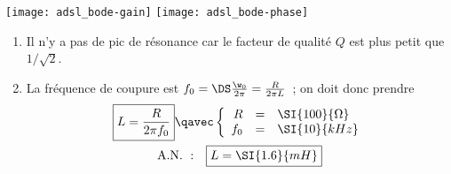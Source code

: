 \documentclass[a4paper, 12pt, final, garamond]{book}
\begin{document}
\begin{center}
    \texttt{[image: adsl\_bode-gain]}
    \texttt{[image: adsl\_bode-phase]}
\end{center}
\begin{enumerate}[resume]
    \item{} Il n'y a pas de pic de résonance car le facteur de qualité $Q$ est
        plus petit que $1/\sqrt{2}$.
    \item La fréquence de coupure est $f_0 = \DS \frac{\w_0}{2\pi} =
        \frac{R}{2\pi L}$~; on doit donc prendre
        \begin{gather*}
            \boxed{L = \frac{R}{2\pi f_0}}
            \qavec
            \left\{
                \begin{array}{rcl}
                    R & = & \SI{100}{\Omega}\\
                    f_0 & = & \SI{10}{kHz}
                \end{array}
            \right.\\
            \mathrm{A.N.~:}\quad
            \boxed{L = \SI{1.6}{mH}}
        \end{gather*}
\end{enumerate}
\end{document}
